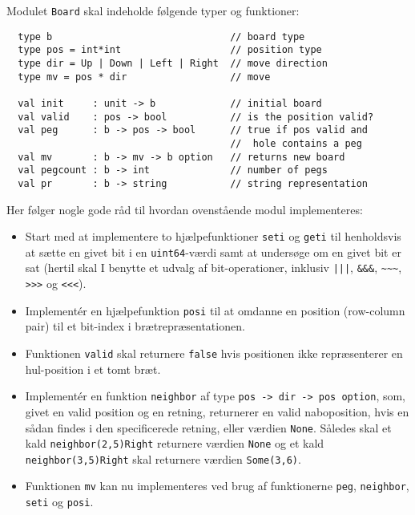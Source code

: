 \begin{description}
Modulet \lstinline{Board} skal indeholde følgende typer og funktioner:
\begin{lstlisting}
  type b                               // board type
  type pos = int*int                   // position type
  type dir = Up | Down | Left | Right  // move direction
  type mv = pos * dir                  // move

  val init     : unit -> b             // initial board
  val valid    : pos -> bool           // is the position valid?
  val peg      : b -> pos -> bool      // true if pos valid and
                                       //  hole contains a peg
  val mv       : b -> mv -> b option   // returns new board
  val pegcount : b -> int              // number of pegs
  val pr       : b -> string           // string representation
\end{lstlisting}

Her følger nogle gode råd til hvordan ovenstående modul implementeres:
\begin{itemize}

\item Start med at implementere to hjælpefunktioner \lstinline{seti} og \lstinline{geti} til henholdsvis at sætte en givet bit i en \lstinline{uint64}-værdi samt at undersøge om en givet bit er sat (hertil skal I benytte et udvalg af bit-operationer, inklusiv \lstinline{|||}, \lstinline{&&&}, \lstinline{~~~}, \lstinline{>>>} og \lstinline{<<<}).

\item Implementér en hjælpefunktion \lstinline{posi} til at omdanne en position (row-column pair) til et bit-index i brætrepræsentationen.

\item Funktionen \lstinline{valid} skal returnere \lstinline{false} hvis positionen ikke repræsenterer en hul-position i et tomt bræt.
\item Implementér en funktion \lstinline{neighbor} af type \lstinline{pos -> dir -> pos option}, som, givet en valid position og en retning, returnerer en valid naboposition, hvis en sådan findes i den specificerede retning, eller værdien \lstinline{None}. Således skal et kald \lstinline{neighbor(2,5)Right} returnere værdien \lstinline{None} og et kald \lstinline{neighbor(3,5)Right} skal returnere værdien \lstinline{Some(3,6)}.
\item Funktionen \lstinline{mv} kan nu implementeres ved brug af funktionerne \lstinline{peg}, \lstinline{neighbor}, \lstinline{seti} og \lstinline{posi}.
\end{itemize}


\end{description}
